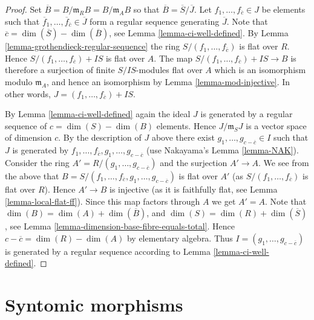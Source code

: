 \begin{proof}
Set $\overline{B} = B/\mathfrak m_RB = B/\mathfrak m_AB$ so that
$\overline{B} = \overline{S}/\overline{J}$.
Let $f_1, \ldots, f_{\overline{c}} \in J$ be elements such that
$\overline{f}_1, \ldots, \overline{f}_{\overline{c}} \in \overline{J}$
form a regular sequence generating $\overline{J}$.
Note that $\overline{c} = \dim(\overline{S}) - \dim(\overline{B})$,
see Lemma \ref{lemma-ci-well-defined}.
By Lemma \ref{lemma-grothendieck-regular-sequence}
the ring $S/(f_1, \ldots, f_{\overline{c}})$ is flat
over $R$. Hence $S/(f_1, \ldots, f_{\overline{c}}) + IS$ is flat over $A$.
The map $S/(f_1, \ldots, f_{\overline{c}}) + IS \to B$ is therefore a
surjection of finite $S/IS$-modules flat over $A$ which
is an isomorphism modulo $\mathfrak m_A$, and hence an
isomorphism by Lemma \ref{lemma-mod-injective}. In other words,
$J = (f_1, \ldots, f_{\overline{c}}) + IS$.

\medskip\noindent
By Lemma \ref{lemma-ci-well-defined} again the ideal $J$ is
generated by a regular sequence of $c = \dim(S) - \dim(B)$ elements. Hence
$J/\mathfrak m_SJ$ is a vector space of dimension $c$.
By the description of $J$ above there exist
$g_1, \ldots, g_{c - \overline{c}} \in I$ such that
$J$ is generated by
$f_1, \ldots, f_{\overline{c}}, g_1, \ldots, g_{c - \overline{c}}$
(use Nakayama's Lemma \ref{lemma-NAK}). Consider the ring
$A' = R/(g_1, \ldots, g_{c - \overline{c}})$ and the surjection
$A' \to A$. We see from the above that
$B = S/(f_1, \ldots, f_{\overline{c}}, g_1, \ldots, g_{c - \overline{c}})$
is flat over $A'$ (as $S/(f_1, \ldots, f_{\overline{c}})$ is flat
over $R$). Hence $A' \to B$ is injective (as it is faithfully flat,
see Lemma \ref{lemma-local-flat-ff}).
Since this map factors through $A$ we get $A' = A$.
Note that $\dim(B) = \dim(A) + \dim(\overline{B})$, and
$\dim(S) = \dim(R) + \dim(\overline{S})$, see
Lemma \ref{lemma-dimension-base-fibre-equals-total}.
Hence $c - \overline{c} = \dim(R) -\dim(A)$ by elementary algebra.
Thus $I = (g_1, \ldots, g_{c - \overline{c}})$ is generated
by a regular sequence according to Lemma \ref{lemma-ci-well-defined}.
\end{proof}






\section{Syntomic morphisms}
\label{section-syntomic}

